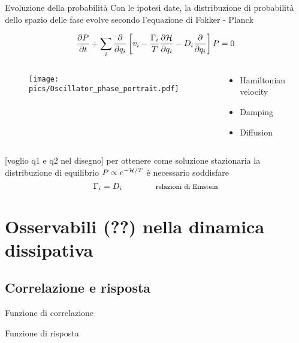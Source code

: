 \documentclass[10pt]{beamer}
\begin{document}
\begin{frame}{Evoluzione della probabilità}
  Con le ipotesi date, la distribuzione di probabilità dello spazio delle fase evolve secondo l'equazione di Fokker - Planck
  
  \begin{equation*}
   \frac{\partial P}{\partial t} + \sum_i \frac{\partial}{\partial q_i} \left[ v_i - \frac{\Gamma_i}{T} \frac{\partial \mathcal{H}}{\partial q_i} - D_i \frac{\partial}{\partial q_i} \right] P = 0
  \end{equation*}
\begin{columns}
 \begin{column}{.5\textwidth}
  \begin{figure}
       \texttt{[image: pics/Oscillator\_phase\_portrait.pdf]}
      \end{figure}
  \end{column}
  \hfill
  \begin{column}{.4\textwidth}
   \begin{itemize}
    \item Hamiltonian velocity
    \item Damping
    \item Diffusion
   \end{itemize}
  \end{column}
\end{columns}
[voglio q1 e q2 nel disegno]
\vskip10pt
 per ottenere come soluzione stazionaria la distribuzione di equilibrio $P \propto e^{-\mathcal{H}/T}$ è necessario soddisfare
 \begin{equation*}
  \Gamma_i = D_i \qquad \qquad \text{\footnotesize relazioni di Einstein}
 \end{equation*}

      
\end{frame}



\section{Osservabili (??) nella dinamica dissipativa}
\subsection{Correlazione e risposta}
\begin{frame}{Funzione di correlazione}
 
\end{frame}

\begin{frame}{Funzione di risposta}
 
\end{frame}
\end{document}
